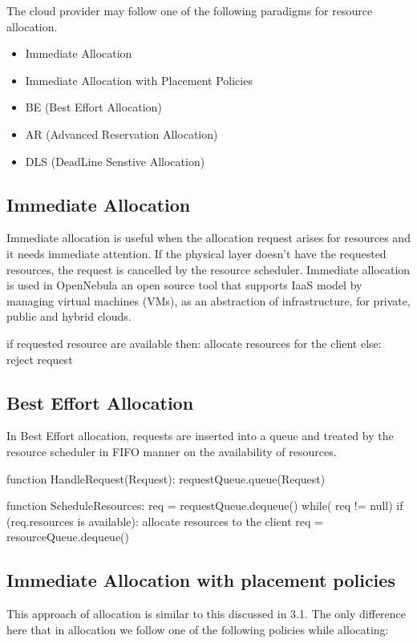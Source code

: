 \documentclass{article}
\begin{document}
The cloud provider may follow one of the following paradigms for resource allocation. 


\begin{itemize}
\item Immediate Allocation
\item Immediate Allocation with Placement Policies
\item BE (Best Effort Allocation)
\item AR (Advanced Reservation Allocation)
\item DLS (DeadLine Senstive Allocation)
\end{itemize}
\newpage

\subsection{Immediate Allocation}
Immediate allocation is useful when the allocation request arises for resources and it needs immediate attention. If the physical layer doesn't have the requested resources, the request is cancelled by the resource scheduler. Immediate allocation is used in OpenNebula an open source tool that supports IaaS model by managing virtual machines (VMs), as an abstraction of infrastructure, for private, public and hybrid clouds.
\begin{center}
\begin{verbatimtab}
if requested resource are available then: 
	allocate resources for the client 
else: 	
	reject request
\end{verbatimtab}
\end{center}

\subsection{Best Effort Allocation}
In Best Effort allocation, requests are inserted into a queue and treated by the resource scheduler in FIFO manner on the availability of resources.

\begin{verbatimtab}
function HandleRequest(Request):
	requestQueue.queue(Request)

function ScheduleResources: 
	req = requestQueue.dequeue()
	while( req != null) 	
		if (req.resources is available): 	
			allocate resources to the client 
			req = resourceQueue.dequeue()
\end{verbatimtab}
\newpage

\subsection{Immediate Allocation with placement policies }
This approach of allocation is similar to this discussed in 3.1. The only difference here that in allocation we follow one of the following policies while allocating:
\end{document}
